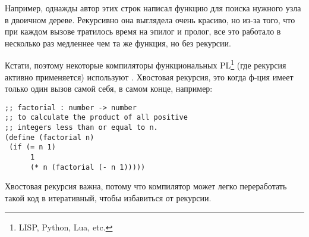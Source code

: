 Например, однажды автор этих строк написал функцию для поиска нужного узла в двоичном дереве. 
Рекурсивно она выглядела очень красиво, но из-за того, что при каждом вызове тратилось время на эпилог и пролог, 
все это работало в несколько раз медленнее чем та же функция, но без рекурсии.

\newcommand{\FnFP}{\footnote{LISP, Python, Lua, etc.}}
Кстати, поэтому некоторые компиляторы функциональных \ac{PL}\FnFP{} (где рекурсия активно применяется) используют .
Хвостовая рекурсия, это когда ф-ция имеет только один вызов самой себя, в самом конце, например:

\begin{lstlisting}[caption=Scheme{,} пример взят из Wikipedia]
;; factorial : number -> number
;; to calculate the product of all positive
;; integers less than or equal to n.
(define (factorial n)
 (if (= n 1)
      1
      (* n (factorial (- n 1)))))
\end{lstlisting}

Хвостовая рекурсия важна, потому что компилятор может легко переработать такой код в итеративный, чтобы избавиться
от рекурсии.


